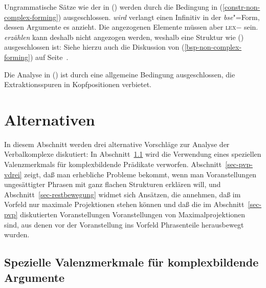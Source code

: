 Ungrammatische Sätze wie der in () werden durch die Bedingung
in (\ref{constr-non-complex-forming}) ausgeschlossen.
\z
\emph{wird} verlangt einen Infinitiv in der \emph{bse}"=Form, dessen Argumente
es anzieht. Die angezogenen Elemente müssen aber \textsc{lex}$-$ sein. \emph{erzählen}
kann deshalb nicht angezogen werden, weshalb eine Struktur wie () ausgeschlossen ist:
\z
Siehe hierzu auch die Diskussion von (\ref{bsp-non-complex-forming}) auf Seite~\pageref{bsp-non-complex-forming}.

Die Analyse in () ist durch eine allgemeine Bedingung ausgeschlossen,
die Extraktionsspuren in Kopfpositionen verbietet.
\z

\section{Alternativen}
\label{sec-alternativen}%

In diesem Abschnitt werden drei alternative Vorschläge zur Analyse der Verbalkomplexe diskutiert:
In Abschnitt~\ref{sec-vcomp} wird die Verwendung eines speziellen Valenzmerkmals für komplexbildende
Prädikate verworfen. Abschnitt~\ref{sec-pvp-vdrei} zeigt, daß man erhebliche Probleme bekommt,
wenn man Voranstellungen ungesättigter Phrasen mit ganz flachen Strukturen erklären will,
und Abschnitt~\ref{sec-restbewegung} widmet sich Ansätzen, die annehmen, daß im Vorfeld nur maximale
Projektionen stehen können und daß die im Abschnitt~\ref{sec-pvp} diskutierten Voranstellungen
Voranstellungen von Maximalprojektionen sind, aus denen vor der Voranstellung ins Vorfeld
Phrasenteile herausbewegt wurden.

\subsection{Spezielle Valenzmerkmale für komplexbildende Argumente}
\label{sec-vcomp}

